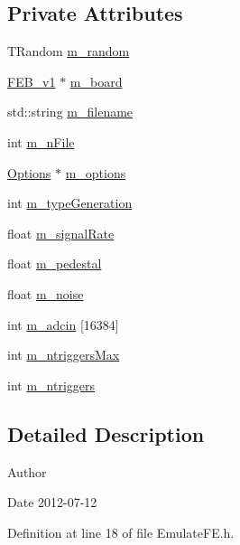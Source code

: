 \subsection*{Private Attributes}
\begin{DoxyCompactItemize}
\item 
TRandom \hyperlink{classEmulateFE_a7f883bc6fb5bde2c98e464ef74e5c643}{m\_\-random}
\item 
\hyperlink{classFEB__v1}{FEB\_\-v1} $\ast$ \hyperlink{classEmulateFE_a6f3c6a104235b167e4465f4169cf8304}{m\_\-board}
\item 
std::string \hyperlink{classEmulateFE_a103fedea9eb5d3963573f9120cb81a68}{m\_\-filename}
\item 
int \hyperlink{classEmulateFE_a04ed956f5992c36590dd5a6abc19de2c}{m\_\-nFile}
\item 
\hyperlink{classOptions}{Options} $\ast$ \hyperlink{classEmulateFE_a2f2da7d4b2164c47673a6ecc6dcef1ea}{m\_\-options}
\item 
int \hyperlink{classEmulateFE_aa8bd0aa42cc5f3d52930408807b3067c}{m\_\-typeGeneration}
\item 
float \hyperlink{classEmulateFE_a7aeff9e62f850ca6d7ee27dce02a060b}{m\_\-signalRate}
\item 
float \hyperlink{classEmulateFE_a033996ce759c11305395ac865a6c074a}{m\_\-pedestal}
\item 
float \hyperlink{classEmulateFE_a74f8720a1da5806fad3811339ef9b98f}{m\_\-noise}
\item 
int \hyperlink{classEmulateFE_a647be38c790d5c0088e971aa28989589}{m\_\-adcin} \mbox{[}16384\mbox{]}
\item 
int \hyperlink{classEmulateFE_a2d473d12faf30f4870458874d70c7f55}{m\_\-ntriggersMax}
\item 
int \hyperlink{classEmulateFE_a8df57e3d66bde60e9a79cb2ae54a9f4a}{m\_\-ntriggers}
\end{DoxyCompactItemize}


\subsection{Detailed Description}
\begin{DoxyAuthor}{Author}

\end{DoxyAuthor}
\begin{DoxyDate}{Date}
2012-\/07-\/12 
\end{DoxyDate}


Definition at line 18 of file EmulateFE.h.

